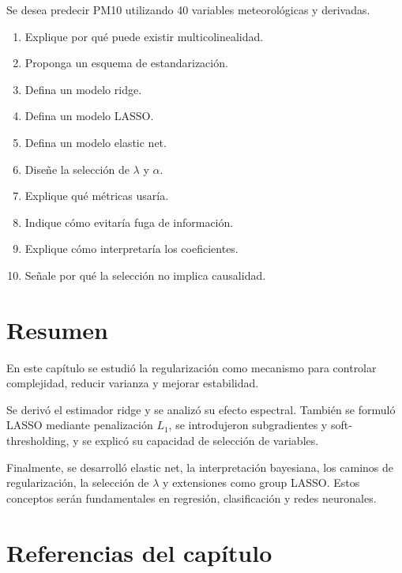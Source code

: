 \documentclass[
  spanish,
  10.5pt,
  letterpaper,
  DIV=11,
  numbers=noendperiod,
  oneside,
  open=any]{scrreprt}
\providecommand{\tightlist}{%
  \setlength{\itemsep}{0pt}\setlength{\parskip}{0pt}}
\theoremstyle{definition}
\theoremstyle{definition}
\theoremstyle{plain}
\theoremstyle{remark}
\begin{document}

Se desea predecir PM10 utilizando 40 variables meteorológicas y
derivadas.

\begin{enumerate}
\def\labelenumi{\arabic{enumi}.}
\tightlist
\item
  Explique por qué puede existir multicolinealidad.
\item
  Proponga un esquema de estandarización.
\item
  Defina un modelo ridge.
\item
  Defina un modelo LASSO.
\item
  Defina un modelo elastic net.
\item
  Diseñe la selección de \(\lambda\) y \(\alpha\).
\item
  Explique qué métricas usaría.
\item
  Indique cómo evitaría fuga de información.
\item
  Explique cómo interpretaría los coeficientes.
\item
  Señale por qué la selección no implica causalidad.
\end{enumerate}

\section*{Resumen}\label{resumen-7}


En este capítulo se estudió la regularización como mecanismo para
controlar complejidad, reducir varianza y mejorar estabilidad.

Se derivó el estimador ridge y se analizó su efecto espectral. También
se formuló LASSO mediante penalización \(L_1\), se introdujeron
subgradientes y soft-thresholding, y se explicó su capacidad de
selección de variables.

Finalmente, se desarrolló elastic net, la interpretación bayesiana, los
caminos de regularización, la selección de \(\lambda\) y extensiones
como group LASSO. Estos conceptos serán fundamentales en regresión,
clasificación y redes neuronales.

\section*{Referencias del capítulo}\label{referencias-del-capuxedtulo-7}
\end{document}
